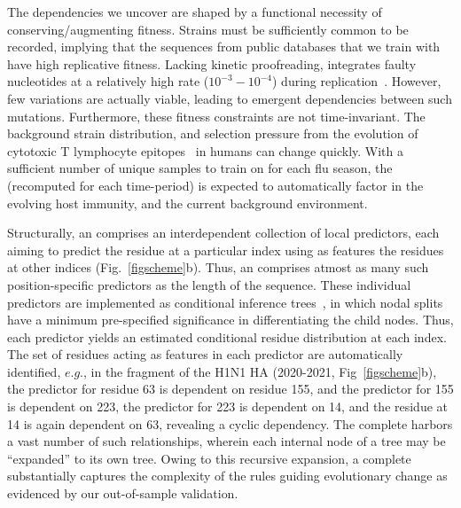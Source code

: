 \documentclass[onecolumn, compsoc,10pt]{IEEEtran}
\begin{document}
The dependencies we uncover are shaped by  a  functional necessity of conserving/augmenting  fitness. Strains must be sufficiently common  to be recorded, implying that the sequences from public databases that we train  with have  high replicative fitness. Lacking kinetic proofreading,  %
\infl integrates  faulty nucleotides   at a relatively high rate ($10^{-3}-10^{-4}$) during  replication~\cite{ahlquist2002rna,chen2006avian}. However, few variations are actually viable, leading to emergent dependencies between such mutations. Furthermore, these fitness constraints are not time-invariant. The background strain distribution, and selection pressure from the evolution of cytotoxic T lymphocyte  epitopes~\cite{woolthuis2016long,fan2012role,van2016differential,berkhoff2007assessment,van2012evasion} in humans can change quickly. With a sufficient number of unique samples to train on for each flu season, the \enet (recomputed for each time-period) is expected to automatically factor in the evolving host immunity, and the current background environment.  

Structurally, an \enet comprises an interdependent collection of  local predictors, each aiming to predict the  residue at a particular index  using as features  the residues   at other  indices  (Fig.~\ref{figscheme}b). Thus,  an \enet comprises atmost as many such  position-specific predictors as the length of the sequence. These individual predictors are implemented as conditional inference trees~\cite{Hothorn06unbiasedrecursive}, in which  nodal splits  have  a minimum pre-specified significance in differentiating the  child nodes. Thus, each predictor yields an estimated conditional residue distribution  at each index. The set of residues acting as features in each predictor are automatically identified, $e.g.$, in the fragment of the  H1N1 HA \enet (2020-2021, Fig~\ref{figscheme}b), the predictor for residue 63 is dependent on   residue  155, and the predictor for  155 is dependent on  223, the predictor for  223 is dependent on  14, and the residue at  14 is again dependent on  63, revealing a cyclic dependency. The complete \enet harbors a vast number of such  relationships, wherein each internal node of a tree may be  ``expanded'' to its own tree. Owing to this recursive expansion,  a complete \enet substantially captures the complexity of the rules guiding evolutionary change as evidenced by our out-of-sample validation.
\end{document}
